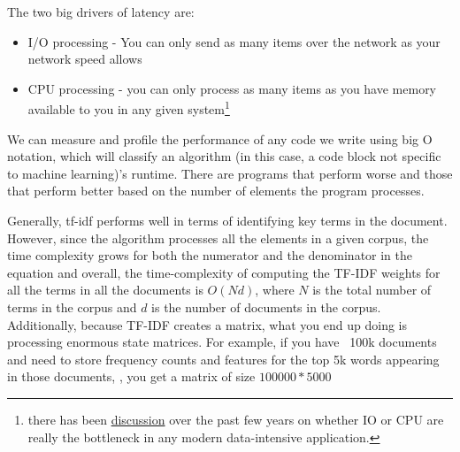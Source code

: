 \documentclass[11pt]{diazessay} %
\begin{document}

The two big drivers of latency are: 

\begin{itemize}
  \item I/O processing - You can only send as many items over the network as your network speed allows
  \item CPU processing - you can only process as many items as you have memory available to you in any given system\footnote{there has been \href{https://benhoyt.com/writings/io-is-no-longer-the-bottleneck/}{discussion} over the past few years on whether IO or CPU are really the bottleneck in any modern data-intensive application.}
\end{itemize}

We can measure and profile the performance of any code we write using big O notation, which will classify an algorithm (in this case, a code block not specific to machine learning)'s runtime.  There are programs that perform worse and those that perform better based on the number of elements the program processes. 

Generally, tf-idf performs well in terms of identifying key terms in the document. However, since the algorithm processes all the elements in a given corpus, the time complexity grows for both the numerator and the denominator in the equation and overall, the time-complexity of computing the TF-IDF weights for all the terms in all the documents is $O(Nd)$, where $N$ is the total number of terms in the corpus and $d$ is the number of documents in the corpus. Additionally, because TF-IDF creates a matrix, what you end up doing is processing enormous state matrices. For example, if you have ~100k documents and need to store frequency counts and features for the top 5k words appearing in those documents, , you get a matrix of size $100000*5000$
\end{document}
